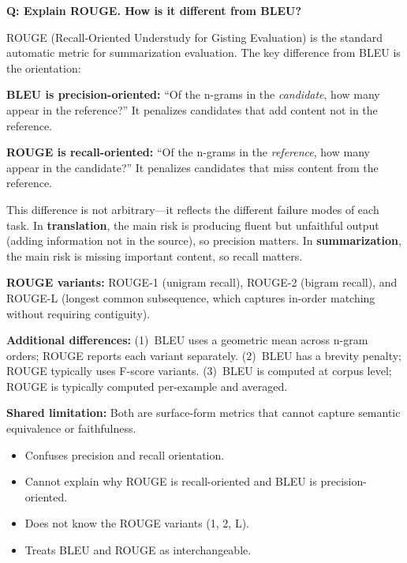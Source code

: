 \begin{interviewq}
\textbf{Q: Explain ROUGE. How is it different from BLEU?}

 \quad {} \quad \badgefreq{\freqhigh}

\stronganswer
ROUGE (Recall-Oriented Understudy for Gisting Evaluation) is the standard
automatic metric for summarization evaluation.  The key difference from BLEU
is the orientation:

\textbf{BLEU is precision-oriented:} ``Of the n-grams in the \emph{candidate},
how many appear in the reference?''  It penalizes candidates that add content
not in the reference.

\textbf{ROUGE is recall-oriented:} ``Of the n-grams in the \emph{reference},
how many appear in the candidate?''  It penalizes candidates that miss content
from the reference.

This difference is not arbitrary---it reflects the different failure modes of
each task.  In \textbf{translation}, the main risk is producing fluent but
unfaithful output (adding information not in the source), so
precision matters.  In \textbf{summarization}, the main risk is missing
important content, so recall matters.

\textbf{ROUGE variants:}
ROUGE-1 (unigram recall), ROUGE-2 (bigram recall), and ROUGE-L (longest common
subsequence, which captures in-order matching without requiring contiguity).

\textbf{Additional differences:}
(1)~BLEU uses a geometric mean across n-gram orders; ROUGE reports each variant
separately.
(2)~BLEU has a brevity penalty; ROUGE typically uses F-score variants.
(3)~BLEU is computed at corpus level; ROUGE is typically computed per-example
and averaged.

\textbf{Shared limitation:} Both are surface-form metrics that cannot capture
semantic equivalence or faithfulness.

\redflags
\begin{itemize}
    \item Confuses precision and recall orientation.
    \item Cannot explain why ROUGE is recall-oriented and BLEU is
          precision-oriented.
    \item Does not know the ROUGE variants (1, 2, L).
    \item Treats BLEU and ROUGE as interchangeable.
\end{itemize}


\end{interviewq}
